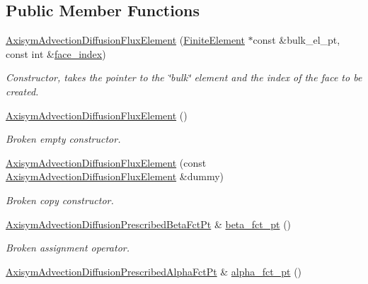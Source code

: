\subsection*{Public Member Functions}
\begin{DoxyCompactItemize}
\item 
\hyperlink{classoomph_1_1AxisymAdvectionDiffusionFluxElement_af3cf91c225808270375927c1b4dbfeb1}{Axisym\+Advection\+Diffusion\+Flux\+Element} (\hyperlink{classoomph_1_1FiniteElement}{Finite\+Element} $\ast$const \&bulk\+\_\+el\+\_\+pt, const int \&\hyperlink{classoomph_1_1FaceElement_a478d577ac6db67ecc80f1f02ae3ab170}{face\+\_\+index})
\begin{DoxyCompactList}\small\item\em Constructor, takes the pointer to the \char`\"{}bulk\char`\"{} element and the index of the face to be created. \end{DoxyCompactList}\item 
\hyperlink{classoomph_1_1AxisymAdvectionDiffusionFluxElement_aa1cd0aff254aebe43bc0709769040291}{Axisym\+Advection\+Diffusion\+Flux\+Element} ()
\begin{DoxyCompactList}\small\item\em Broken empty constructor. \end{DoxyCompactList}\item 
\hyperlink{classoomph_1_1AxisymAdvectionDiffusionFluxElement_ab37a5f165394c2a03a3d8d6de6fae148}{Axisym\+Advection\+Diffusion\+Flux\+Element} (const \hyperlink{classoomph_1_1AxisymAdvectionDiffusionFluxElement}{Axisym\+Advection\+Diffusion\+Flux\+Element} \&dummy)
\begin{DoxyCompactList}\small\item\em Broken copy constructor. \end{DoxyCompactList}\item 
\hyperlink{classoomph_1_1AxisymAdvectionDiffusionFluxElement_ad4453706dae676758946691686e1a1c3}{Axisym\+Advection\+Diffusion\+Prescribed\+Beta\+Fct\+Pt} \& \hyperlink{classoomph_1_1AxisymAdvectionDiffusionFluxElement_a3f81fc1578f2cec5a54a8a5671610dbb}{beta\+\_\+fct\+\_\+pt} ()
\begin{DoxyCompactList}\small\item\em Broken assignment operator. \end{DoxyCompactList}\item 
\hyperlink{classoomph_1_1AxisymAdvectionDiffusionFluxElement_aa0922f19043ccc259c61c704fa3b5767}{Axisym\+Advection\+Diffusion\+Prescribed\+Alpha\+Fct\+Pt} \& \hyperlink{classoomph_1_1AxisymAdvectionDiffusionFluxElement_a6e19586f128e5a8be0c5592147a49938}{alpha\+\_\+fct\+\_\+pt} ()

\end{DoxyCompactItemize}
